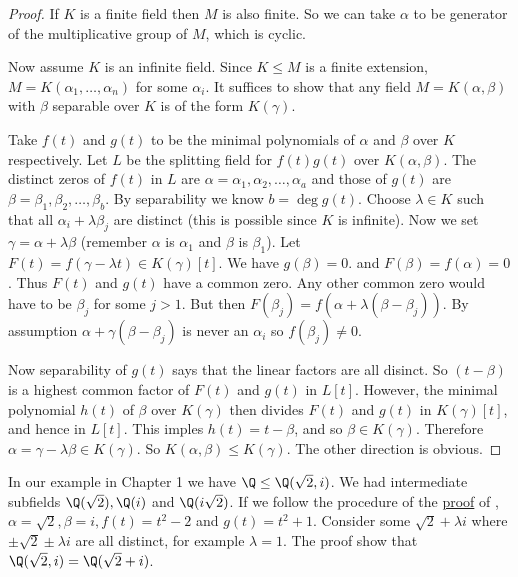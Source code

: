\documentclass[a4paper]{article}
\begin{document}
\begin{proof}
  \label{proof:primitive}
  If \(K\) is a finite field then \(M\) is also finite. So we can take \(\alpha\) to be generator of the multiplicative group of \(M\), which is cyclic.

  Now assume \(K\) is an infinite field. Since \(K \leq M\) is a finite extension, \(M = K(\alpha_1, \dots, \alpha_n)\) for some \(\alpha_i\). It suffices to show that any field \(M = K(\alpha, \beta)\) with \(\beta\) separable over \(K\) is of the form \(K(\gamma)\).

  Take \(f(t)\) and \(g(t)\) to be the minimal polynomials of \(\alpha\) and \(\beta\) over \(K\) respectively. Let \(L\) be the splitting field for \(f(t)g(t)\) over \(K(\alpha, \beta)\). The distinct zeros of \(f(t)\) in \(L\) are \(\alpha = \alpha_1, \alpha_2, \dots, \alpha_a\) and those of \(g(t)\) are \(\beta = \beta_1, \beta_2, \dots, \beta_b\). By separability we know \(b = \deg g(t)\). Choose \(\lambda \in K\) such that all \(\alpha_i + \lambda \beta_j\) are distinct (this is possible since \(K\) is infinite). Now we set \(\gamma = \alpha + \lambda \beta\) (remember \(\alpha\) is \(\alpha_1\) and \(\beta\) is \(\beta_1\)). Let \(F(t) = f(\gamma - \lambda t) \in K(\gamma)[t]\). We have \(g(\beta) = 0\). and \(F(\beta) = f(\alpha) = 0\). Thus \(F(t)\) and \(g(t)\) have a common zero. Any other common zero would have to be \(\beta_j\) for some \(j > 1\). But then \(F(\beta_j) = f(\alpha + \lambda(\beta - \beta_j))\). By assumption \(\alpha + \gamma(\beta - \beta_j)\) is never an \(\alpha_i\) so \(f(\beta_j) \neq 0\).

  Now separability of \(g(t)\) says that the linear factors are all disinct. So \((t - \beta)\) is a highest common factor of \(F(t)\) and \(g(t)\) in \(L[t]\). However, the minimal polynomial \(h(t)\) of \(\beta\) over \(K(\gamma)\) then divides \(F(t)\) and \(g(t)\) in \(K(\gamma)[t]\), and hence in \(L[t]\). This imples \(h(t) = t - \beta\), and so \(\beta \in K(\gamma)\). Therefore \(\alpha = \gamma - \lambda \beta \in K(\gamma)\). So \(K(\alpha, \beta) \leq K(\gamma)\). The other direction is obvious.
\end{proof}

\begin{ex}
  In our example in Chapter 1  we have \(\Q \leq \Q(\sqrt 2, i)\). We had intermediate subfields \(\Q(\sqrt 2), \Q(i)\) and \(\Q(i\sqrt 2)\). If we follow the procedure of the \hyperref[proof:primitive]{proof} of , \(\alpha = \sqrt 2, \beta = i, f(t) = t^2 - 2\) and \(g(t) = t^2 + 1\). Consider some \(\sqrt 2 + \lambda i\) where \(\pm \sqrt 2 \pm \lambda i\) are all distinct, for example \(\lambda = 1\). The proof show that \(\Q(\sqrt 2, i) = \Q(\sqrt 2 + i)\).
\end{ex}
\end{document}
